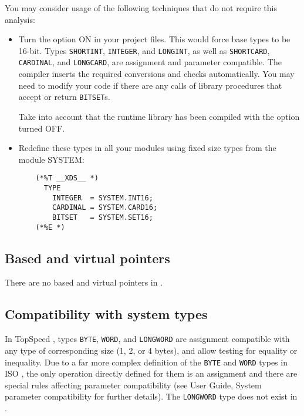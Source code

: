     You may consider usage of the following techniques that do not require 
    this analysis:
    \begin{itemize}
    \item Turn the  option ON in your project files. This would 
          force base types to be 16-bit. Types \verb'SHORTINT', \verb'INTEGER',
          and \verb'LONGINT', as well as \verb'SHORTCARD', \verb'CARDINAL',
          and \verb'LONGCARD', are assignment and parameter compatible. 
          The compiler inserts the required conversions and checks 
          automatically. You may need to modify your code if there are
          any calls of library procedures that accept or return \verb'BITSET's.

          Take into account that the \xds{} runtime library has been 
          compiled with the  option turned OFF. 

    \item Redefine these types in all your modules using fixed size types 
          from the module SYSTEM:
\begin{verbatim}
    (*%T __XDS__ *)
      TYPE 
        INTEGER  = SYSTEM.INT16;
        CARDINAL = SYSTEM.CARD16;
        BITSET   = SYSTEM.SET16;
    (*%E *)
\end{verbatim}
    \end{itemize}

\subsection{Based and virtual pointers}

    There are no based and virtual pointers in \xds{}.

\subsection{Compatibility with system types }

    In TopSpeed \mt{}, types \verb'BYTE', \verb'WORD', and \verb'LONGWORD'
    are assignment compatible with any type of corresponding size
    (1, 2, or 4 bytes), and allow testing for equality or inequality.
    Due to a far more complex definition of the \verb'BYTE' and \verb'WORD'
    types in ISO \mt{}, the only operation directly defined for them is an
    assignment and there are special rules affecting parameter compatibility
    (see \xds{} User Guide, System parameter compatibility for further details).
    The \verb'LONGWORD' type does not exist in \xds{}.

